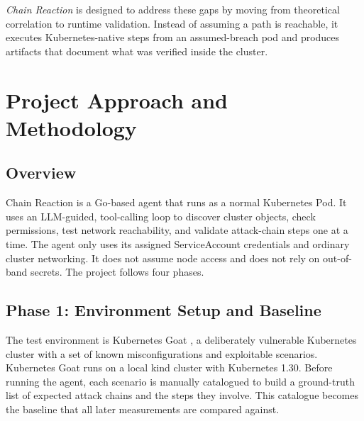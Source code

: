 \documentclass[conference]{IEEEtran}
\begin{document}
\emph{Chain Reaction} is designed to address these gaps by moving from theoretical correlation to runtime validation. Instead of assuming a path is reachable, it executes Kubernetes-native steps from an assumed-breach pod and produces artifacts that document what was verified inside the cluster.

\section{Project Approach and Methodology}

\subsection{Overview}
Chain Reaction is a Go-based agent that runs as a normal Kubernetes Pod. It uses an LLM-guided, tool-calling loop to discover cluster objects, check permissions, test network reachability, and validate attack-chain steps one at a time. The agent only uses its assigned ServiceAccount credentials and ordinary cluster networking. It does not assume node access and does not rely on out-of-band secrets. The project follows four phases.

\subsection{Phase 1: Environment Setup and Baseline}
The test environment is Kubernetes Goat \cite{kubegoat2023}, a deliberately vulnerable Kubernetes cluster with a set of known misconfigurations and exploitable scenarios. Kubernetes Goat runs on a local kind cluster with Kubernetes 1.30. Before running the agent, each scenario is manually catalogued to build a ground-truth list of expected attack chains and the steps they involve. This catalogue becomes the baseline that all later measurements are compared against.
\end{document}
